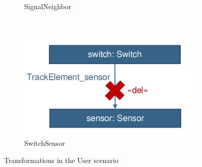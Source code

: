 \begin{figure}
\begin{subfigure}[b]{0.3\textwidth}
                \caption{SignalNeighbor}
                \label{fig:trainbenchmark-transformation-user-signalneighbor}
        \end{subfigure}%
        ~
        \begin{subfigure}[b]{0.3\textwidth}
                \includegraphics[width=\textwidth]{figures/trainbenchmark-transformation-user-switchsensor}
                \caption{SwitchSensor}
                \label{fig:trainbenchmark-transformation-user-switchsensor}
        \end{subfigure}
        \caption{Transformations in the User scenario}\label{fig:animals}
\end{figure}


